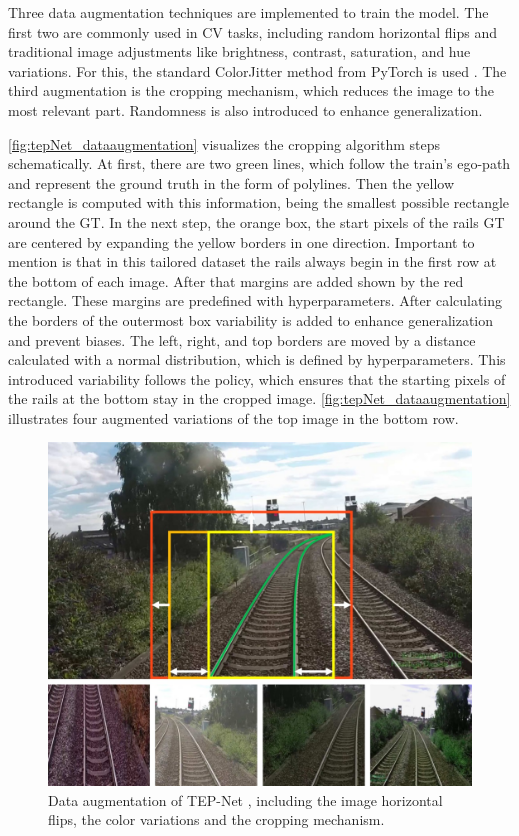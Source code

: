 Three data augmentation techniques are implemented to train the model.
The first two are commonly used in CV tasks, including random horizontal flips and traditional image adjustments like brightness, contrast, saturation, and hue variations.
For this, the standard ColorJitter method from PyTorch is used \cite{pytorch_colorJitter_docu}.
The third augmentation is the cropping mechanism, which reduces the image to the most relevant part.
Randomness is also introduced to enhance generalization.

\autoref{fig:tepNet_dataaugmentation} visualizes the cropping algorithm steps schematically.
At first, there are two green lines, which follow the train's ego-path and represent the ground truth in the form of polylines.
Then the yellow rectangle is computed with this information, being the smallest possible rectangle around the GT.
In the next step, the orange box, the start pixels of the rails GT are centered by expanding the yellow borders in one direction.
Important to mention is that in this tailored dataset the rails always begin in the first row at the bottom of each image.
After that margins are added shown by the red rectangle.
These margins are predefined with hyperparameters.
After calculating the borders of the outermost box variability is added to enhance generalization and prevent biases.
The left, right, and top borders are moved by a distance calculated with a normal distribution, which is defined by hyperparameters.
This introduced variability follows the policy, which ensures that the starting pixels of the rails at the bottom stay in the cropped image.
\autoref{fig:tepNet_dataaugmentation} illustrates four augmented variations of the top image in the bottom row.

\begin{figure}[H]
    \centering
    \includegraphics[width=\linewidth]{PICs/Baselinepaper/data_augmenation.jpg}
    \caption{Data augmentation of \ac{TEP}-Net \cite{tepNet2024}, including the image horizontal flips, the color variations and the cropping mechanism.}
    \label{fig:tepNet_dataaugmentation}
\end{figure}

